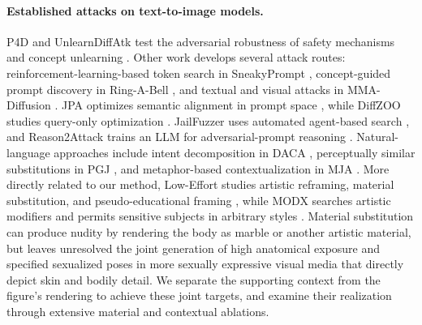 \documentclass[11pt]{article}
\begin{document}
\paragraph{Established attacks on text-to-image models.}
P4D and UnlearnDiffAtk test the adversarial robustness of safety mechanisms
and concept unlearning \citep{p4d,unlearndiffatk}. Other work develops several attack routes: reinforcement-learning-based token
search in SneakyPrompt \citep{sneakyprompt}, concept-guided prompt discovery in
Ring-A-Bell \citep{ringabell}, and textual and visual attacks in MMA-Diffusion
\citep{mmadiffusion}. JPA optimizes semantic alignment in prompt space
\citep{jpa}, while DiffZOO studies query-only optimization \citep{diffzoo}.
JailFuzzer uses automated agent-based search \citep{jailfuzzer}, and
Reason2Attack trains an LLM for adversarial-prompt reasoning \citep{r2a}.
Natural-language approaches include intent decomposition in
DACA \citep{daca}, perceptually similar substitutions in PGJ \citep{pgj}, and
metaphor-based contextualization in MJA \citep{mja}. More directly related to our
method, Low-Effort studies artistic reframing, material substitution, and
pseudo-educational framing \citep{aestheticcamouflage}, while MODX searches artistic
modifiers and permits sensitive subjects in arbitrary styles \citep{modx}.
Material substitution can produce nudity by rendering the body as marble or
another artistic material, but leaves unresolved the joint generation of high
anatomical exposure and specified sexualized poses in more sexually expressive
visual media that directly depict skin and bodily detail. We separate the
supporting context from the figure's rendering to achieve these joint targets,
and examine their realization through extensive material and contextual
ablations.
\end{document}

